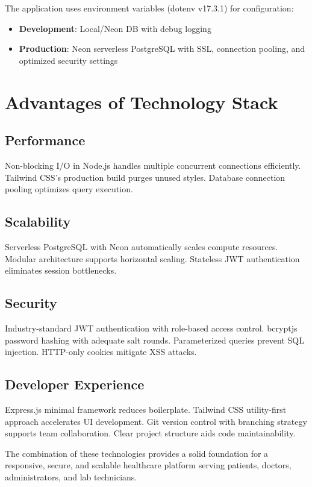 The application uses environment variables (dotenv v17.3.1) for configuration:
\begin{itemize}
    \item \textbf{Development}: Local/Neon DB with debug logging
    \item \textbf{Production}: Neon serverless PostgreSQL with SSL, connection pooling, and optimized security settings
\end{itemize}

\section{Advantages of Technology Stack}

\subsection{Performance}
Non-blocking I/O in Node.js handles multiple concurrent connections efficiently. Tailwind CSS's production build purges unused styles. Database connection pooling optimizes query execution.

\subsection{Scalability}
Serverless PostgreSQL with Neon automatically scales compute resources. Modular architecture supports horizontal scaling. Stateless JWT authentication eliminates session bottlenecks.

\subsection{Security}
Industry-standard JWT authentication with role-based access control. bcryptjs password hashing with adequate salt rounds. Parameterized queries prevent SQL injection. HTTP-only cookies mitigate XSS attacks.

\subsection{Developer Experience}
Express.js minimal framework reduces boilerplate. Tailwind CSS utility-first approach accelerates UI development. Git version control with branching strategy supports team collaboration. Clear project structure aids code maintainability.

The combination of these technologies provides a solid foundation for a responsive, secure, and scalable healthcare platform serving patients, doctors, administrators, and lab technicians.
